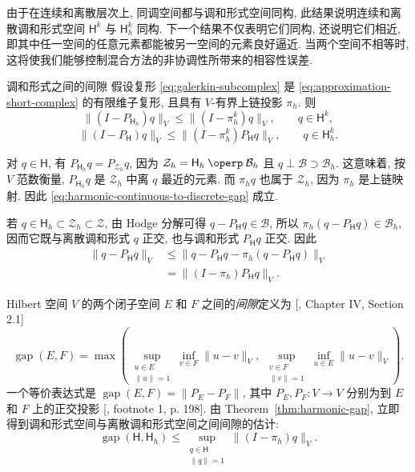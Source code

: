 由于在连续和离散层次上, 同调空间都与调和形式空间同构, 此结果说明连续和离散调和形式空间 $\mathsf H^k$ 与 $\mathsf H_h^k$ 同构. 下一个结果不仅表明它们同构, 还说明它们相近, 即其中任一空间的任意元素都能被另一空间的元素良好逼近. 当两个空间不相等时, 这将使我们能够控制混合方法的非协调性所带来的相容性误差.

\begin{Theorem}{{调和形式之间的间隙}}\label{thm:harmonic-gap}
假设复形 \eqref{eq:galerkin-subcomplex} 是 \eqref{eq:approximation-short-complex} 的有限维子复形, 且具有 $V$-有界上链投影 $\pi_h$. 则
\begin{equation}\label{eq:harmonic-continuous-to-discrete-gap}
\|(I-P_{\mathsf H_h})q\|_V\leq\|(I-\pi_h^k)q\|_V,\qquad q\in\mathsf H^k,
\end{equation}
\begin{equation}\label{eq:harmonic-discrete-to-continuous-gap}
\|(I-P_{\mathsf H})q\|_V\leq\|(I-\pi_h^k)P_{\mathsf H}q\|_V,\qquad q\in\mathsf H_h^k.
\end{equation}
\end{Theorem}

\begin{Proof}
对 $q\in\mathsf H$, 有 $P_{\mathsf H_h}q=P_{\mathcal Z_h}q$, 因为 $\mathcal Z_h=\mathsf H_h\BookOrthSum\mathcal B_h$ 且 $q\perp\mathcal B\supset\mathcal B_h$. 这意味着, 按 $V$ 范数衡量, $P_{\mathsf H_h}q$ 是 $\mathcal Z_h$ 中离 $q$ 最近的元素. 而 $\pi_hq$ 也属于 $\mathcal Z_h$, 因为 $\pi_h$ 是上链映射. 因此 \eqref{eq:harmonic-continuous-to-discrete-gap} 成立.

若 $q\in\mathsf H_h\subset\mathcal Z_h\subset\mathcal Z$, 由 Hodge 分解可得 $q-P_{\mathsf H}q\in\mathcal B$, 所以 $\pi_h(q-P_{\mathsf H}q)\in\mathcal B_h$, 因而它既与离散调和形式 $q$ 正交, 也与调和形式 $P_{\mathsf H}q$ 正交. 因此
\[
\begin{aligned}
\|q-P_{\mathsf H}q\|_V&\leq\|q-P_{\mathsf H}q-\pi_h(q-P_{\mathsf H}q)\|_V\\
&=\|(I-\pi_h)P_{\mathsf H}q\|_V.
\end{aligned}
\]
\end{Proof}

Hilbert 空间 $V$ 的两个闭子空间 $E$ 和 $F$ 之间的\emph{间隙}定义为 [, Chapter IV, Section 2.1]
\begin{equation}\label{eq:subspace-gap-definition}
\operatorname{gap}(E,F)=\max\left(\sup_{\substack{u\in E\\\|u\|=1}}\inf_{v\in F}\|u-v\|_V,\ \sup_{\substack{v\in F\\\|v\|=1}}\inf_{u\in E}\|u-v\|_V\right).
\end{equation}
一个等价表达式是 $\operatorname{gap}(E,F)=\|P_E-P_F\|$, 其中 $P_E,P_F:V\to V$ 分别为到 $E$ 和 $F$ 上的正交投影 [, footnote 1, p. 198]. 由 Theorem~\ref{thm:harmonic-gap}, 立即得到调和形式空间与离散调和形式空间之间间隙的估计:
\[
\operatorname{gap}(\mathsf H,\mathsf H_h)\leq\sup_{\substack{q\in\mathsf H\\\|q\|=1}}\|(I-\pi_h)q\|_V.
\]

